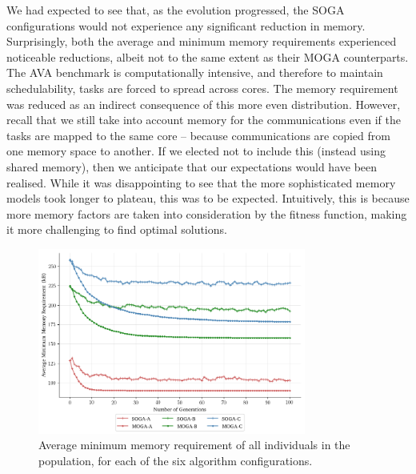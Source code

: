 \documentclass[10pt,conference]{IEEEtran}
\begin{document}
We had expected to see that, as the evolution progressed, the SOGA configurations would not experience any significant reduction in memory. Surprisingly, both the average and minimum memory requirements experienced noticeable reductions, albeit not to the same extent as their MOGA counterparts. The AVA benchmark is computationally intensive, and therefore to maintain schedulability, tasks are forced to spread across cores. The memory requirement was reduced as an indirect consequence of this more even distribution. However, recall that we still take into account memory for the communications even if the tasks are mapped to the same core -- because communications are copied from one memory space to another. If we elected not to include this (instead using shared memory), then we anticipate that our expectations would have been realised. While it was disappointing to see that the more sophisticated memory models took longer to plateau, this was to be expected. Intuitively, this is because more memory factors are taken into consideration by the fitness function, making it more challenging to find optimal solutions.

\begin{figure}[!ht]
  \centering
  \includegraphics*[width=8.8cm,keepaspectratio]{fig/results-min-memory-requirement-generations}
\vspace{-5ex}
  \caption{Average minimum memory requirement of all individuals in the population, for each of the six algorithm configurations.}
  \label{fig:results-min-memory-requirement-generations}
\vspace{-2.5ex}
\end{figure}
\end{document}
